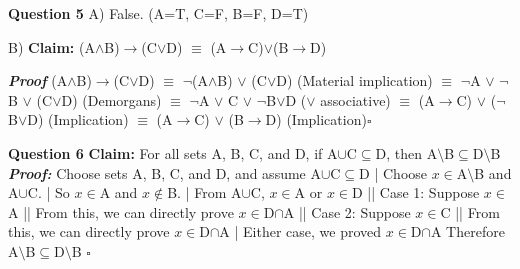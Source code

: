 \documentclass{article}
\begin{document}
\textbf{Question 5}\newline
A)	False. (A=T, C=F, B=F, D=T)\newline\newline

B)	\textbf{Claim: }(A$\wedge$B)$\rightarrow$(C$\lor$D) $\equiv$ (A$\rightarrow$C)$\lor$(B$\rightarrow$D)\newline

\textbf{\textit{Proof}}\newline
(A$\wedge$B)$\rightarrow$(C$\lor$D) $\equiv$ $\neg$(A$\wedge$B) $\lor$ (C$\lor$D) (Material implication)\newline
$\equiv$ $\neg$A $\lor$ $\neg$B $\lor$ (C$\lor$D) (Demorgans)\newline
$\equiv$ $\neg$A $\lor$ C $\lor$ $\neg$B$\lor$D ($\lor$ associative)\newline
$\equiv$ (A$\rightarrow$C) $\lor$ ($\neg$B$\lor$D) (Implication)\newline
$\equiv$ (A$\rightarrow$C) $\lor$ (B$\rightarrow$D) (Implication)$\square$\newline\newline

\textbf{Question 6}\newline
\textbf{Claim: } For all sets A, B, C, and D, if A$\cup$C$\subseteq$D, then A$\setminus$B$\subseteq$D$\setminus$B\newline
\textbf{\textit{Proof: }}\newline
Choose sets A, B, C, and D, and assume  A$\cup$C$\subseteq$D
|	Choose $x$$\in$A$\setminus$B and A$\cup$C.\newline
|	So $x$$\in$A and $x$$\notin$B.\newline
|	From A$\cup$C, $x$$\in$A or $x$$\in$D\newline
||		Case 1: Suppose $x$$\in$A\newline
||		From this, we can directly prove $x$$\in$D$\cap$A\newline
||		Case 2: Suppose $x$$\in$C\newline
||		From this, we can directly prove $x$$\in$D$\cap$A\newline
|		Either case, we proved  $x$$\in$D$\cap$A\newline
Therefore A$\setminus$B$\subseteq$D$\setminus$B $\square$
\end{document}
